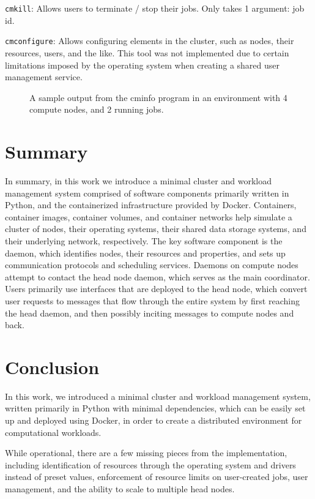 \documentclass[sigconf]{acmart}
\begin{document}
\verb|cmkill|: Allows users to terminate / stop their jobs. Only takes 1 argument: job id.

\verb|cmconfigure|: Allows configuring elements in the cluster, such as nodes, their resources, users, and the
    like. This tool was not implemented due to certain limitations imposed by the operating system when creating a shared
    user management service.

\begin{figure}[ht]
    \centering
    
    \caption{A sample output from the cminfo program in an environment with 4 compute nodes, and 2 running jobs.}
    \label{fig:cminfo}
\end{figure}

\section{Summary}
In summary, in this work we introduce a minimal cluster and workload management system comprised of software components
primarily written in Python, and the containerized infrastructure provided by Docker.
Containers, container images, container volumes, and container networks help simulate a cluster of nodes, their operating
systems, their shared data storage systems, and their underlying network, respectively.
The key software component is the daemon, which identifies nodes, their resources and properties, and sets up communication
protocols and scheduling services. Daemons on compute nodes attempt to contact the head node daemon, which serves as the main
coordinator. 
Users primarily use interfaces that are deployed to the head node, which convert user requests to messages that flow through the
entire system by first reaching the head daemon, and then possibly inciting messages to compute nodes and back.

\section{Conclusion}
In this work, we introduced a minimal cluster and workload management system, written primarily in Python with minimal
dependencies, which can be easily set up and deployed using Docker, in order to create a distributed environment for
computational workloads.

While operational, there are a few missing pieces from the implementation, including identification of resources through the
operating system and drivers instead of preset values, enforcement of resource limits on user-created jobs, user management, and
the ability to scale to multiple head nodes.
\end{document}
